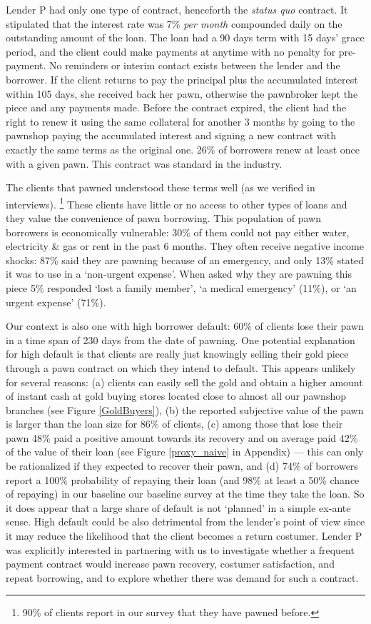 \documentclass[oneside,11pt]{article}
\begin{document}
Lender P had only one type of contract, henceforth the \textit{status quo} contract. It stipulated that the interest rate was 7\% \textit{per month} compounded daily on the outstanding amount of the loan. The loan had a 90 days term with 15 days' grace period, and the client could make payments at anytime with no penalty for pre-payment. No reminders or interim contact exists between the lender and the borrower.  If the client returns to pay the principal plus the accumulated interest within 105 days, she received back her pawn, otherwise the pawnbroker kept the piece and any payments made. Before the contract expired, the client had the right to renew it  using the same collateral for another 3 months by going to the pawnshop paying the accumulated interest and signing a new contract with exactly the same terms as the original one.  26\% of borrowers renew at least once with a given pawn. This contract was standard in the industry.  


The clients that pawned understood these terms well (as we verified in interviews). \footnote{90\% of clients report in our survey that they have pawned before.} These clients have little or no access to other types of loans and they value the convenience of pawn borrowing.  This population of pawn borrowers is economically vulnerable:  30\% of them could not pay either water, electricity \& gas or rent in the past 6 months. They often receive negative income shocks: 87\% said they are pawning because of an emergency, and only 13\% stated it was to use in a `non-urgent expense'.  When asked why they are pawning this piece 5\% responded `lost a family member', `a medical emergency' (11\%), or `an urgent expense' (71\%).


Our context is also one with high borrower default: 60\% of clients lose their pawn in a time span of 230 days from the date of pawning.   One potential explanation for high default is that clients are really just knowingly selling their gold piece through a pawn contract on which they intend to default. This appears unlikely for several reasons: (a) clients can easily sell the gold and obtain a higher amount of instant cash at gold buying stores located close to almost all our pawnshop branches (see Figure \ref{GoldBuyers}), (b) the reported subjective value of the pawn is larger than the loan size for 86\% of clients, (c) among those that lose their pawn 48\% paid a positive amount towards its recovery and on average paid 42\% of the value of their loan (see Figure \ref{proxy_naive} in Appendix) --- this can only be rationalized if they expected to recover their pawn, and (d) 74\% of borrowers report a 100\% probability of repaying their loan (and 98\% at least a 50\% chance of repaying) in our baseline our baseline survey at the time they take the loan.  So it does appear that a large share of default is not `planned' in a simple ex-ante sense.  High default could be also detrimental from the lender's point of view since it may reduce the likelihood that the client becomes a return costumer. Lender P was explicitly interested in  partnering with us to investigate whether a frequent payment contract would increase pawn recovery, costumer satisfaction, and repeat borrowing, and to explore whether there was demand for such a contract. 
\end{document}
